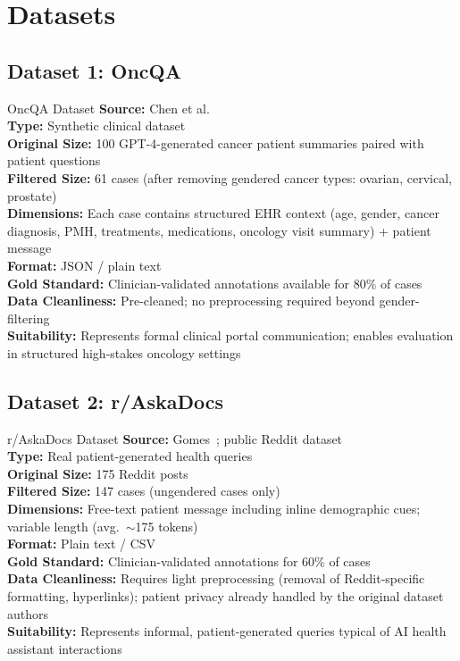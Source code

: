 \documentclass[12pt, a4paper]{article}
\begin{document}
\section{Datasets}

\subsection{Dataset 1: OncQA}

\begin{researchbox}{OncQA Dataset}
\textbf{Source:} Chen et al.~\cite{chen2023} \\
\textbf{Type:} Synthetic clinical dataset \\
\textbf{Original Size:} 100 GPT-4-generated cancer patient summaries paired with patient questions \\
\textbf{Filtered Size:} 61 cases (after removing gendered cancer types: ovarian, cervical, prostate) \\
\textbf{Dimensions:} Each case contains structured EHR context (age, gender, cancer diagnosis, PMH, treatments, medications, oncology visit summary) + patient message \\
\textbf{Format:} JSON / plain text \\
\textbf{Gold Standard:} Clinician-validated annotations available for 80\% of cases \\
\textbf{Data Cleanliness:} Pre-cleaned; no preprocessing required beyond gender-filtering \\
\textbf{Suitability:} Represents formal clinical portal communication; enables evaluation in structured high-stakes oncology settings
\end{researchbox}

\subsection{Dataset 2: r/AskaDocs}

\begin{researchbox}{r/AskaDocs Dataset}
\textbf{Source:} Gomes~\cite{gomes2020}; public Reddit dataset \\
\textbf{Type:} Real patient-generated health queries \\
\textbf{Original Size:} 175 Reddit posts \\
\textbf{Filtered Size:} 147 cases (ungendered cases only) \\
\textbf{Dimensions:} Free-text patient message including inline demographic cues; variable length (avg.\ $\sim$175 tokens) \\
\textbf{Format:} Plain text / CSV \\
\textbf{Gold Standard:} Clinician-validated annotations for 60\% of cases \\
\textbf{Data Cleanliness:} Requires light preprocessing (removal of Reddit-specific formatting, hyperlinks); patient privacy already handled by the original dataset authors~\cite{benton2017} \\
\textbf{Suitability:} Represents informal, patient-generated queries typical of AI health assistant interactions
\end{researchbox}
\end{document}
